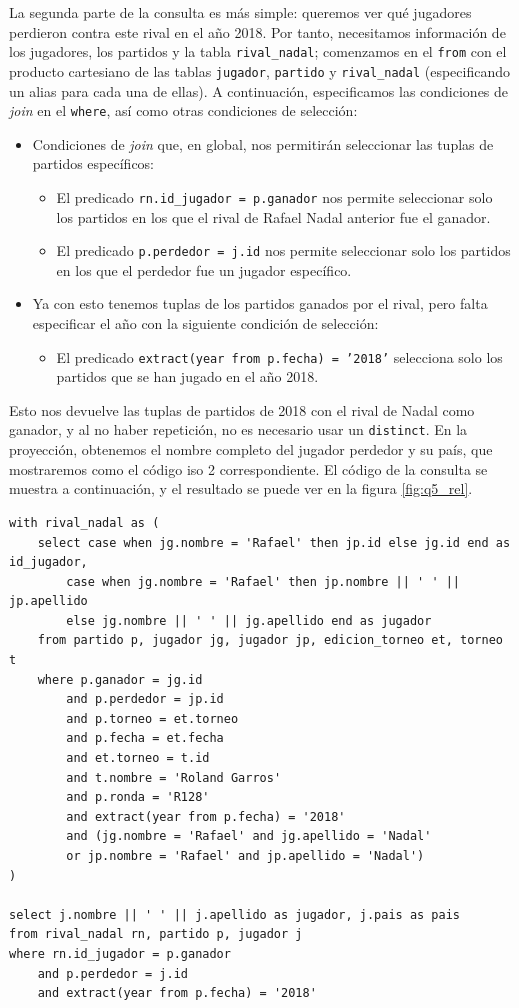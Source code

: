 \documentclass[11pt]{opticajnl}
\begin{document}
La segunda parte de la consulta es más simple: queremos ver qué jugadores perdieron contra este rival en el año 2018. Por tanto, necesitamos información de los jugadores, los partidos y la tabla \texttt{rival\_nadal}; comenzamos en el \texttt{from} con el producto cartesiano de las tablas \texttt{jugador}, \texttt{partido} y \texttt{rival\_nadal} (especificando un alias para cada una de ellas). A continuación, especificamos las condiciones de \textit{join} en el \texttt{where}, así como otras condiciones de selección:
\begin{itemize}
\item Condiciones de \textit{join} que, en global, nos permitirán seleccionar las tuplas de partidos específicos:
\begin{itemize}
\item El predicado \texttt{rn.id\_jugador = p.ganador} nos permite seleccionar solo los partidos en los que el rival de Rafael Nadal anterior fue el ganador.
\item El predicado \texttt{p.perdedor = j.id} nos permite seleccionar solo los partidos en los que el perdedor fue un jugador específico.
\end{itemize}
\item Ya con esto tenemos tuplas de los partidos ganados por el rival, pero falta especificar el año con la siguiente condición de selección: 
\begin{itemize}
\item El predicado \texttt{extract(year from p.fecha) = '2018'} selecciona solo los partidos que se han jugado en el año 2018.
\end{itemize}
\end{itemize}

Esto nos devuelve las tuplas de partidos de 2018 con el rival de Nadal como ganador, y al no haber repetición, no es necesario usar un \texttt{distinct}. En la proyección, obtenemos el nombre completo del jugador perdedor y su país, que mostraremos como el código iso 2 correspondiente. El código de la consulta se muestra a continuación, y el resultado se puede ver en la figura \ref{fig:q5_rel}.

\begin{verbatim}
with rival_nadal as (
	select case when jg.nombre = 'Rafael' then jp.id else jg.id end as id_jugador, 
		case when jg.nombre = 'Rafael' then jp.nombre || ' ' || jp.apellido 
		else jg.nombre || ' ' || jg.apellido end as jugador
	from partido p, jugador jg, jugador jp, edicion_torneo et, torneo t
	where p.ganador = jg.id 
		and p.perdedor = jp.id
		and p.torneo = et.torneo 
		and p.fecha = et.fecha
		and et.torneo = t.id 
		and t.nombre = 'Roland Garros'
		and p.ronda = 'R128'
		and extract(year from p.fecha) = '2018'
		and (jg.nombre = 'Rafael' and jg.apellido = 'Nadal' 
		or jp.nombre = 'Rafael' and jp.apellido = 'Nadal') 
)

select j.nombre || ' ' || j.apellido as jugador, j.pais as pais
from rival_nadal rn, partido p, jugador j
where rn.id_jugador = p.ganador 
	and p.perdedor = j.id
	and extract(year from p.fecha) = '2018'
\end{verbatim}
\end{document}
